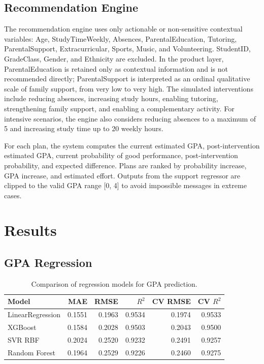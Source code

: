 \documentclass[12pt,onecolumn]{IEEEtran}
\begin{document}
\subsection{Recommendation Engine}

The recommendation engine uses only actionable or non-sensitive contextual variables: Age, StudyTimeWeekly, Absences, ParentalEducation, Tutoring, ParentalSupport, Extracurricular, Sports, Music, and Volunteering. StudentID, GradeClass, Gender, and Ethnicity are excluded. In the product layer, ParentalEducation is retained only as contextual information and is not recommended directly; ParentalSupport is interpreted as an ordinal qualitative scale of family support, from very low to very high. The simulated interventions include reducing absences, increasing study hours, enabling tutoring, strengthening family support, and enabling a complementary activity. For intensive scenarios, the engine also considers reducing absences to a maximum of 5 and increasing study time up to 20 weekly hours.

For each plan, the system computes the current estimated GPA, post-intervention estimated GPA, current probability of good performance, post-intervention probability, and expected difference. Plans are ranked by probability increase, GPA increase, and estimated effort. Outputs from the support regressor are clipped to the valid GPA range [0, 4] to avoid impossible messages in extreme cases.

\section{Results}

\subsection{GPA Regression}

\begin{table}[!t]
\centering
\caption{Comparison of regression models for GPA prediction.}
\label{tab:regression}
\begin{tabular}{lrrrrr}
\toprule
Model & MAE & RMSE & $R^2$ & CV RMSE & CV $R^2$ \\
\midrule
LinearRegression & 0.1551 & 0.1963 & 0.9534 & 0.1974 & 0.9533 \\
XGBoost & 0.1584 & 0.2028 & 0.9503 & 0.2043 & 0.9500 \\
SVR RBF & 0.2024 & 0.2520 & 0.9232 & 0.2491 & 0.9257 \\
Random Forest & 0.1964 & 0.2529 & 0.9226 & 0.2460 & 0.9275 \\
\bottomrule
\end{tabular}
\end{table}
\end{document}
